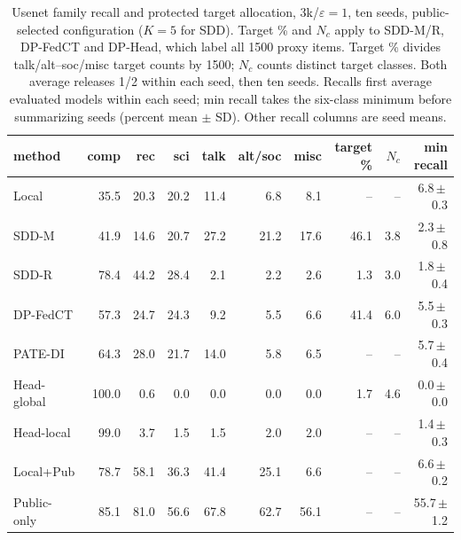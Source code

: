 \begin{table}[t]
\centering
\caption{Usenet family recall and protected target allocation, 3k/$\varepsilon=1$, ten seeds, public-selected configuration ($K=5$ for SDD). Target \% and $N_c$ apply to SDD-M/R, DP-FedCT and DP-Head, which label all 1500 proxy items. Target \% divides talk/alt--soc/misc target counts by 1500; $N_c$ counts distinct target classes. Both average releases 1/2 within each seed, then ten seeds. Recalls first average evaluated models within each seed; min recall takes the six-class minimum before summarizing seeds (percent mean $\pm$ SD). Other recall columns are seed means.}
\label{tab:web-recall}\label{tab:target-coverage}
\small\setlength{\tabcolsep}{3pt}
\begin{tabular}{@{}lrrrrrrrrr@{}}\toprule
method & comp & rec & sci & talk & alt/soc & misc & target \% & $N_c$ & min recall \\\midrule
Local & 35.5 & 20.3 & 20.2 & 11.4 & 6.8 & 8.1 & -- & -- & 6.8\,$\pm$\,0.3 \\
SDD-M & 41.9 & 14.6 & 20.7 & 27.2 & 21.2 & 17.6 & 46.1 & 3.8 & 2.3\,$\pm$\,0.8 \\
SDD-R & 78.4 & 44.2 & 28.4 & 2.1 & 2.2 & 2.6 & 1.3 & 3.0 & 1.8\,$\pm$\,0.4 \\
DP-FedCT & 57.3 & 24.7 & 24.3 & 9.2 & 5.5 & 6.6 & 41.4 & 6.0 & 5.5\,$\pm$\,0.3 \\
PATE-DI & 64.3 & 28.0 & 21.7 & 14.0 & 5.8 & 6.5 & -- & -- & 5.7\,$\pm$\,0.4 \\
Head-global & 100.0 & 0.6 & 0.0 & 0.0 & 0.0 & 0.0 & 1.7 & 4.6 & 0.0\,$\pm$\,0.0 \\
Head-local & 99.0 & 3.7 & 1.5 & 1.5 & 2.0 & 2.0 & -- & -- & 1.4\,$\pm$\,0.3 \\
Local+Pub & 78.7 & 58.1 & 36.3 & 41.4 & 25.1 & 6.6 & -- & -- & 6.6\,$\pm$\,0.2 \\
Public-only & 85.1 & 81.0 & 56.6 & 67.8 & 62.7 & 56.1 & -- & -- & 55.7\,$\pm$\,1.2 \\
\bottomrule\end{tabular}
\end{table}
